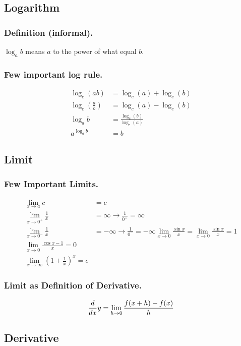 \documentclass[../../../main.tex]{subfiles}
\begin{document}
\subsection{Logarithm}
\subsubsection{Definition (informal).} $\log_a b$ means $a$ to the power of what equal $b$.

\subsubsection{Few important log rule.}
\begin{align*}
    \log_c (ab)&=\log_c (a)+\log_c (b)\\
    \log_c (\frac{a}{b})&=\log_c (a)-\log_c (b)\\
    \log_a b&=\frac{\log_c (b)}{\log_c (a)}\\
    a^{\log_a b}&=b
\end{align*}

\subsection{Limit}
\subsubsection{Few Important Limits.}
\begin{align*}
    \lim_{x\to a} c&=c\\
    \lim_{x\to 0^+} \frac{1}{x}&=\infty\rightarrow\frac{1}{0^+}=\infty\\
    \lim_{x\to 0^-} \frac{1}{x}&=-\infty\rightarrow\frac{1}{0^-}=-\infty
    \lim_{x\to0} \frac{\sin x }{x}=\lim_{x\to0} \frac{\sin x }{x}=1\\
    \lim_{x\to0} \frac{\cos x-1 }{x}=0\\
    \lim_{x\to\infty} \left(1+\frac{1 }{x }\right)^x=e
\end{align*}
\subsubsection{Limit as Definition of Derivative.}
\begin{align*}
    \frac{d}{dx} y=\lim_{h\to 0}\frac{f(x+h)-f(x)}{h}
\end{align*}

\subsection{Derivative}
\end{document}
